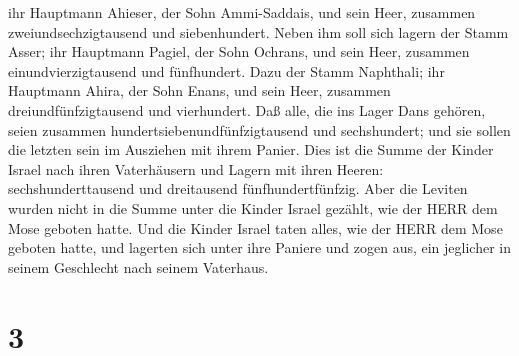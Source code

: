 ihr Hauptmann Ahieser, der Sohn Ammi-Saddais,  und sein
Heer, zusammen zweiundsechzigtausend und siebenhundert. 
Neben ihm soll sich lagern der Stamm Asser; ihr Hauptmann Pagiel, der
Sohn Ochrans,  und sein Heer, zusammen einundvierzigtausend
und fünfhundert.  Dazu der Stamm Naphthali; ihr Hauptmann
Ahira, der Sohn Enans,  und sein Heer, zusammen
dreiundfünfzigtausend und vierhundert.  Daß alle, die ins
Lager Dans gehören, seien zusammen hundertsiebenundfünfzigtausend und
sechshundert; und sie sollen die letzten sein im Ausziehen mit ihrem
Panier.  Dies ist die Summe der Kinder Israel nach ihren
Vaterhäusern und Lagern mit ihren Heeren: sechshunderttausend und
dreitausend fünfhundertfünfzig.  Aber die Leviten wurden
nicht in die Summe unter die Kinder Israel gezählt, wie der HERR dem
Mose geboten hatte.  Und die Kinder Israel taten alles, wie
der HERR dem Mose geboten hatte, und lagerten sich unter ihre Paniere
und zogen aus, ein jeglicher in seinem Geschlecht nach seinem Vaterhaus.

\hypertarget{section-2}{%
\section{3}\label{section-2}}


